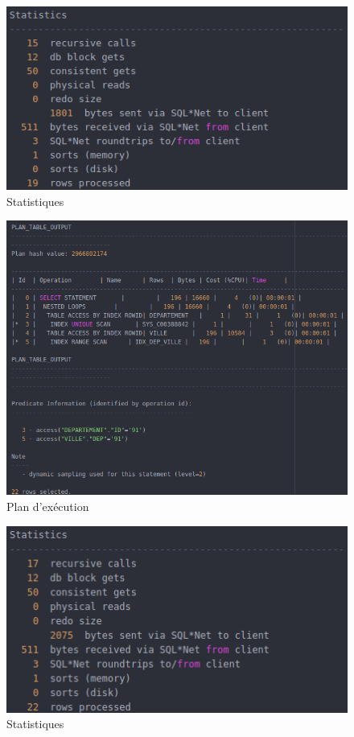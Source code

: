 \documentclass[a4paper,12pt]{article}
\begin{document}
\begin{figure}[!ht]
  \centering
  \includegraphics[scale=0.6]{images/q9_2.png}
  \caption{Statistiques}
\end{figure}

\newpage

\begin{figure}[!ht]
  \centering
  \includegraphics[scale=0.6]{images/q9_3.png}
  \caption{Plan d'exécution}
  \label{fig:qu9_3}
\end{figure}

\begin{figure}[!ht]
  \centering
  \includegraphics[scale=0.6]{images/q9_4.png}
  \caption{Statistiques}
\end{figure}
\end{document}
